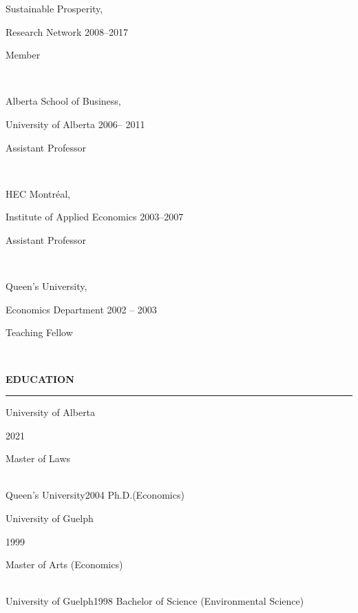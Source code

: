 \documentclass{article}[12pt]
\newcommand{\negind}{\hspace*{-15pt}}
\newcommand{\education}[4]{\negind \begin{bf} #1 \end{bf} \hfill  #2

\hfill \parbox[b]{.93\textwidth}{ #3 }\\[-.95ex]

}
\newcommand{\experience}[4]{\negind \begin{bf} #1, \end{bf} #2 \hfill  #3

\hfill \parbox[b]{.93\textwidth}{ #4 }\hfill\\[-.25ex]}
\begin{document}
\experience{Sustainable Prosperity}{Research Network}{2008--2017}{Member}


\experience{Alberta School of Business}{University of Alberta}{2006-- 2011}{Assistant Professor} %

\experience{HEC Montr\'{e}al}{Institute of Applied Economics
}{2003--2007}{Assistant Professor} %

\experience{Queen's University}{Economics Department}{2002 -- 2003} {Teaching
Fellow}




\bigskip                                                            %


 \vspace{1cm}                                 %

\newpage

\noindent \textbf{{\large EDUCATION}}

\medskip
{\large\scshape\hrule\vspace{0.8\baselineskip}} %
\bigskip                                                            %


\education{University of Alberta}{2021} {Master of Laws}

\education{Queen's University}{2004} {Ph.D.(Economics)}

 \education{University of Guelph}{1999} {Master of Arts (Economics)}

 \education{University
of Guelph}{1998} {Bachelor of Science (Environmental Science)}
\end{document}
